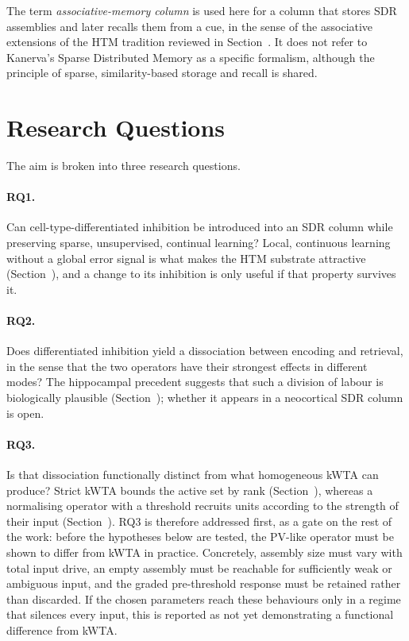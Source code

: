 The term \emph{associative-memory column} is used here for a column that
stores SDR assemblies and later recalls them from a cue, in the sense of the
associative extensions of the HTM tradition reviewed in
Section~. It does not refer to Kanerva's Sparse
Distributed Memory as a specific formalism, although the principle of sparse,
similarity-based storage and recall is shared.

\section{Research Questions}
\label{sec:aims-rq}

The aim is broken into three research questions.

\paragraph{RQ1.} Can cell-type-differentiated inhibition be introduced into an
SDR column while preserving sparse, unsupervised, continual learning? Local,
continuous learning without a global error signal is what makes the HTM
substrate attractive (Section~), and a change
to its inhibition is only useful if that property survives it.

\paragraph{RQ2.} Does differentiated inhibition yield a dissociation between
encoding and retrieval, in the sense that the two operators have their
strongest effects in different modes? The hippocampal precedent suggests that
such a division of labour is biologically plausible
(Section~); whether it appears in a neocortical SDR
column is open.

\paragraph{RQ3.} Is that dissociation functionally distinct from what
homogeneous kWTA can produce? Strict kWTA bounds the active set by rank
(Section~), whereas a normalising operator
with a threshold recruits units according to the strength of their input
(Section~). RQ3 is therefore addressed
first, as a gate on the rest of the work: before the hypotheses below are
tested, the PV-like operator must be shown to differ from kWTA in practice.
Concretely, assembly size must vary with total input drive, an empty assembly
must be reachable for sufficiently weak or ambiguous input, and the graded
pre-threshold response must be retained rather than discarded. If the chosen
parameters reach these behaviours only in a regime that silences every input,
this is reported as not yet demonstrating a functional difference from kWTA.

